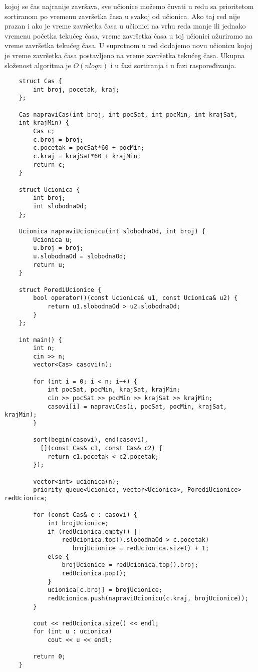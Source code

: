 \documentclass{article}
\begin{document}
kojoj se čas najranije završava, sve učionice možemo čuvati u redu sa prioritetom
sortiranom po vremenu završetka časa u svakoj od učionica. Ako taj red nije
prazan i ako je vreme završetka časa u učionici na vrhu reda manje ili jednako
vremenu početka tekućeg časa, vreme završetka časa u toj učionici ažuriramo na
vreme završetka tekućeg časa. U suprotnom u red dodajemo novu
učionicu kojoj je vreme završetka časa postavljeno na vreme završetka tekućeg
časa.
\newline
Ukupna složenost algoritma je $O(nlogn)$ i u fazi sortiranja i u fazi raspoređivanja.
\begin{lstlisting}
    struct Cas {
        int broj, pocetak, kraj;
    };

    Cas napraviCas(int broj, int pocSat, int pocMin, int krajSat, 
    int krajMin) {
        Cas c;
        c.broj = broj;
        c.pocetak = pocSat*60 + pocMin;
        c.kraj = krajSat*60 + krajMin;
        return c;
    }

    struct Ucionica {
        int broj;
        int slobodnaOd;
    };

    Ucionica napraviUcionicu(int slobodnaOd, int broj) {
        Ucionica u;
        u.broj = broj;
        u.slobodnaOd = slobodnaOd;
        return u;
    }

    struct PorediUcionice {
        bool operator()(const Ucionica& u1, const Ucionica& u2) {
            return u1.slobodnaOd > u2.slobodnaOd;
        }
    };

    int main() {
        int n;
        cin >> n;
        vector<Cas> casovi(n);
        
        for (int i = 0; i < n; i++) {
            int pocSat, pocMin, krajSat, krajMin;
            cin >> pocSat >> pocMin >> krajSat >> krajMin;
            casovi[i] = napraviCas(i, pocSat, pocMin, krajSat, krajMin);
        }
        
        sort(begin(casovi), end(casovi), 
          [](const Cas& c1, const Cas& c2) {
            return c1.pocetak < c2.pocetak;
        });
        
        vector<int> ucionica(n);
        priority_queue<Ucionica, vector<Ucionica>, PorediUcionice> redUcionica;
        
        for (const Cas& c : casovi) {
            int brojUcionice;
            if (redUcionica.empty() || 
                redUcionica.top().slobodnaOd > c.pocetak)
                   brojUcionice = redUcionica.size() + 1;
            else {
                brojUcionice = redUcionica.top().broj;
                redUcionica.pop();
            }
            ucionica[c.broj] = brojUcionice;
            redUcionica.push(napraviUcionicu(c.kraj, brojUcionice));
        }
        
        cout << redUcionica.size() << endl;
        for (int u : ucionica)
            cout << u << endl;
            
        return 0;
    }
\end{lstlisting}
\newpage
\end{document}
